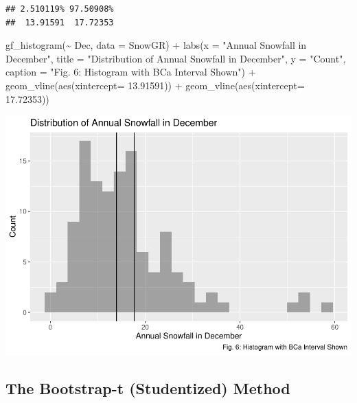 \documentclass[12pt]{article}
\newenvironment{Shaded}{\begin{snugshade}}{\end{snugshade}}
\newcommand{\AttributeTok}[1]{\textcolor[rgb]{0.77,0.63,0.00}{#1}}
\newcommand{\FloatTok}[1]{\textcolor[rgb]{0.00,0.00,0.81}{#1}}
\newcommand{\FunctionTok}[1]{\textcolor[rgb]{0.00,0.00,0.00}{#1}}
\newcommand{\NormalTok}[1]{#1}
\newcommand{\SpecialCharTok}[1]{\textcolor[rgb]{0.00,0.00,0.00}{#1}}
\newcommand{\StringTok}[1]{\textcolor[rgb]{0.31,0.60,0.02}{#1}}
\begin{document}
\begin{verbatim}
## 2.510119% 97.50908% 
##  13.91591  17.72353
\end{verbatim}

\begin{Shaded}
\begin{Highlighting}[]
\FunctionTok{gf\_histogram}\NormalTok{(}\SpecialCharTok{\textasciitilde{}}\NormalTok{ Dec, }\AttributeTok{data =}\NormalTok{ SnowGR) }\SpecialCharTok{+}
  \FunctionTok{labs}\NormalTok{(}\AttributeTok{x =} \StringTok{"Annual Snowfall in December"}\NormalTok{, }
       \AttributeTok{title =} \StringTok{"Distribution of Annual Snowfall in December"}\NormalTok{, }\AttributeTok{y =} \StringTok{"Count"}\NormalTok{,}
       \AttributeTok{caption =} \StringTok{"Fig. 6: Histogram with BCa Interval Shown"}\NormalTok{) }\SpecialCharTok{+}
  \FunctionTok{geom\_vline}\NormalTok{(}\FunctionTok{aes}\NormalTok{(}\AttributeTok{xintercept=} \FloatTok{13.91591}\NormalTok{)) }\SpecialCharTok{+}
  \FunctionTok{geom\_vline}\NormalTok{(}\FunctionTok{aes}\NormalTok{(}\AttributeTok{xintercept=} \FloatTok{17.72353}\NormalTok{))}
\end{Highlighting}
\end{Shaded}

\includegraphics{paper_files/figure-latex/unnamed-chunk-17-1.pdf}

\hypertarget{the-bootstrap-t-studentized-method}{%
\subsection{The Bootstrap-t (Studentized)
Method}\label{the-bootstrap-t-studentized-method}}
\end{document}
